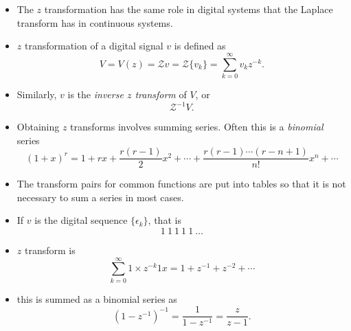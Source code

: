 
\begin{slide}\label{slide:l8s1}
\begin{itemize}
 \item The $z$ transformation has the same role in digital systems
 that the Laplace transform has in continuous systems.
 \item $z$ transformation of a digital signal $v$ is defined as \[V =
 V(z) = \mathcal{Z} v = \mathcal{Z} \{ v_{k} \}=\sum_{k=0}^{\infty}
 v_k z^{-k}.\] 

 \item Similarly, $v$ is the \emph{inverse $z$
 transform} of $V$, or
   \[\mathcal{Z}^{-1} V.\]

\end{itemize}

\end{slide}


\begin{slide}\label{slide:l8s1a}

\begin{itemize}

\item Obtaining $z$ transforms involves summing series. Often this is a
\emph{binomial} series \[(1+x)^r = 1 + rx + \frac{r(r-1)}{2}x^2 +
\cdots + \frac{r(r-1)\cdots(r-n+1)}{n!}x^n + \cdots\]

\item The transform pairs for common functions
are put into tables so that it is not necessary to sum a series in
most cases.

\end{itemize}

\end{slide}

\begin{slide}\label{slide:l8s1a1}

\begin{itemize}

\item If $v$ is the digital sequence $\{\epsilon_k\}$, that is
\[1\ 1\ 1\ 1\ 1\ \ldots\]

\item $z$ transform is
\[\sum_{k=0}^{\infty} 1\times z^{-k} 1x= 1 + z^{-1} + z^{-2}+\cdots\] 

\item this is summed
as a binomial series as \[(1-z^{-1})^{-1} = \frac{1}{1-z^{-1}} =
\frac{z}{z-1}.\] 

\end{itemize}
\end{slide}

